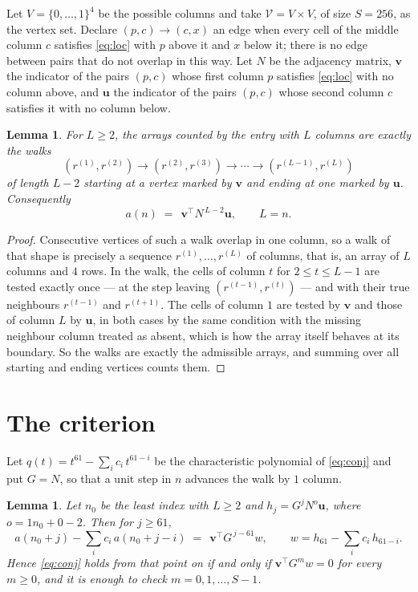 \documentclass[11pt,a4paper]{article}
\theoremstyle{plain}
\newtheorem{lemma}[theorem]{Lemma}
\theoremstyle{definition}
\begin{document}
Let $V=\{0,\dots,1\}^{4}$ be the possible columns and take
$\mathcal V=V\times V$, of size $S=256$, as the vertex set. Declare $(p,c)\to(c,x)$ an edge
when every cell of the middle column $c$ satisfies \eqref{eq:loc} with $p$ above it and $x$
below it; there is no edge between pairs that do not overlap in this way. Let $N$ be the
adjacency matrix, $\mathbf{v}$ the indicator of the pairs $(p,c)$ whose first column $p$
satisfies \eqref{eq:loc} with no column above, and $\mathbf{u}$ the indicator of
the pairs $(p,c)$ whose second column $c$ satisfies it with no column below.

\begin{lemma}\label{lem:walk}
For $L\ge2$, the arrays counted by the entry with $L$ columns are exactly the walks
\[
(r^{(1)},r^{(2)})\to(r^{(2)},r^{(3)})\to\cdots\to(r^{(L-1)},r^{(L)})
\]
of length $L-2$ starting at a vertex marked by $\mathbf{v}$ and ending at one marked by
$\mathbf{u}$. Consequently
\[
a(n)\;=\;\,\mathbf{v}^{\!\top}N^{\,L-2}\mathbf{u},\qquad L=n .
\]
\end{lemma}

\begin{proof}
Consecutive vertices of such a walk overlap in one column, so a walk of that shape is
precisely a sequence $r^{(1)},\dots,r^{(L)}$ of columns, that is, an array of $L$ columns
and $4$ rows. In the walk, the cells of column $t$ for $2\le t\le L-1$ are tested
exactly once --- at the step leaving $(r^{(t-1)},r^{(t)})$ --- and with their true
neighbours $r^{(t-1)}$ and $r^{(t+1)}$. The cells of column $1$ are tested by
$\mathbf{v}$ and those of column $L$ by $\mathbf{u}$, in both cases by the same condition
with the missing neighbour column treated as absent, which is how the array itself behaves at
its boundary. So the walks are exactly the admissible arrays, and summing over all starting
and ending vertices counts them.
\end{proof}

\section{The criterion}

Let $q(t)=t^{61}-\sum_i c_i\,t^{61-i}$ be the characteristic polynomial of
\eqref{eq:conj} and put $G=N$, so that a unit step in $n$ advances the walk by
$1$ column.

\begin{lemma}\label{lem:crit}
Let $n_0$ be the least index with $L\ge2$ and $h_j=G^{j}N^{o}\mathbf{u}$, where
$o=1n_0+0-2$. Then for $j\ge61$,
\[
a(n_0+j)-\sum_i c_i\,a(n_0+j-i)\;=\;\,\mathbf{v}^{\!\top}G^{\,j-61}w,
\qquad w=h_{61}-\sum_i c_i\,h_{61-i} .
\]
Hence \eqref{eq:conj} holds from that point on if and only if
$\mathbf{v}^{\!\top}G^{m}w=0$ for every $m\ge0$, and it is enough to check
$m=0,1,\dots,S-1$.
\end{lemma}
\end{document}

